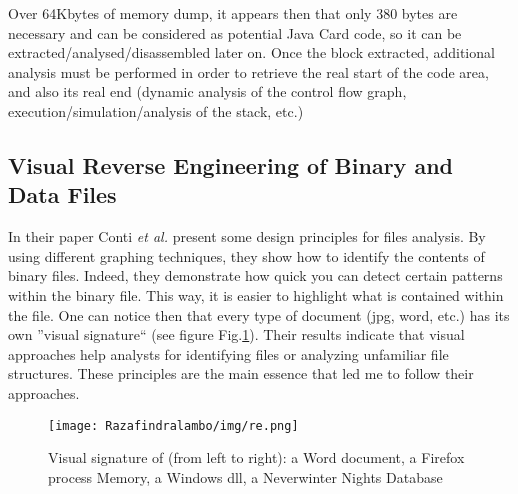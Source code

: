 Over 64Kbytes of memory dump, it appears then that only 380 bytes are necessary and can be considered as
potential Java Card code, so it can be extracted/analysed/disassembled later on.  Once the block
extracted, additional analysis must be performed in order to retrieve the real start of the code
area, and also its real end (dynamic analysis of the control flow graph,
execution/simulation/analysis of the stack, etc.)

\subsection{Visual Reverse Engineering of Binary and Data Files}
\label{subsection:visualreverse}

In their paper Conti \textit{et al.} \cite{Conti:2008:VRE:1431913.1431914} present some design
principles for files analysis. By using different graphing techniques, they show how to identify the
contents of binary files.  Indeed, they demonstrate how quick you can detect certain patterns within
the binary file. This way, it is easier to highlight what is contained within the file. One can notice then that every type
of document (jpg, word, etc.) has its own ''visual signature`` (see figure Fig.\ref{fig:re}). Their results
indicate that visual approaches help analysts for identifying files or analyzing unfamiliar file
structures. These principles are the main essence that led me to follow their approaches.

\begin{figure}[!h]
\center
    \texttt{[image: Razafindralambo/img/re.png]}
    \caption{Visual signature of (from left to right): a Word document, a Firefox process Memory, a Windows dll, a
    Neverwinter Nights Database}
    \label{fig:re}
\end{figure}






